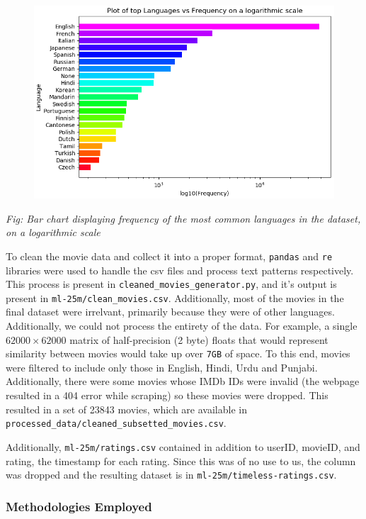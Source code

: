 \documentclass[11pt]{article}
\begin{document}
\begin{figure}
    \centering
    \includegraphics[]{language_count.png}
\end{figure}
\begin{center}
    \textit{Fig: Bar chart displaying frequency of the most common languages in the dataset, on a logarithmic scale}
\end{center}
To clean the movie data and collect it into a proper format,
\texttt{pandas} and \texttt{re} libraries were used to handle the csv
files and process text patterns respectively. This process is present in
\texttt{cleaned\_movies\_generator.py}, and it's output is present in
\texttt{ml-25m/clean\_movies.csv}. Additionally, most of the movies in
the final dataset were irrelvant, primarily because they were of other
languages. Additionally, we could not process the entirety of the data.
For example, a single \(62000\times62000\) matrix of half-precision (2
byte) floats that would represent similarity between movies would take
up over \texttt{7GB} of space. To this end, movies were filtered to
include only those in English, Hindi, Urdu and Punjabi. Additionally,
there were some movies whose IMDb IDs were invalid (the webpage resulted
in a 404 error while scraping) so these movies were dropped. This
resulted in a set of 23843 movies, which are available in
\texttt{processed\_data/cleaned\_subsetted\_movies.csv}.

Additionally, \texttt{ml-25m/ratings.csv} contained in addition to
userID, movieID, and rating, the timestamp for each rating. Since this
was of no use to us, the column was dropped and the resulting dataset is
in \texttt{ml-25m/timeless-ratings.csv}.

    \hypertarget{methodologies-employed}{%
\subsubsection{Methodologies Employed}\label{methodologies-employed}}
\end{document}
